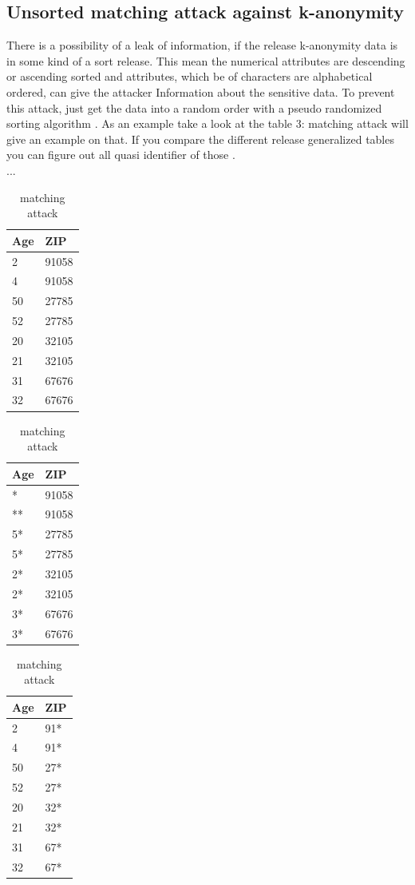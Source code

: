 \documentclass{llncs}
\begin{document}
\subsection{Unsorted matching attack against k-anonymity}
There is a possibility of a leak of information, if the release k-anonymity data is in some kind of a sort release. This mean the numerical attributes are descending or ascending sorted and attributes, which be of characters are alphabetical ordered, can give the attacker Information about the sensitive data. To prevent this attack, just get the data into a random order with a pseudo randomized sorting algorithm \cite{sweeney2002k}. As an example take a look at the table 3: matching attack  will give an example on that. If you compare the different release generalized tables you can figure out all quasi identifier of those \cite{sweeney2002k}.
\\...
\begin{table}	
	\caption{matching attack}
	\centering
	\begin{tabular}[t]{|l|l|}		
	\hline
	Age & ZIP   \\ \hline
	2   & 91058 \\ 
	4   & 91058 \\ 
	50  & 27785 \\ 
	52  & 27785 \\ 
	20  & 32105 \\ 
	21  & 32105 \\ 
	31  & 67676 \\ 
	32  & 67676 \\ \hline
		\end{tabular}
	\hfill
	\begin{tabular}[t]{|l|l|}
	\hline
	Age & ZIP   \\ \hline
	*   & 91058 \\
	**   & 91058 \\
	5*  & 27785 \\
	5*  & 27785 \\
	2*  & 32105 \\
	2*  & 32105 \\
	3*  & 67676 \\
	3*  & 67676 \\ \hline  
	\end{tabular}
	\hfill
	\begin{tabular}[t]{|l|l|}
	\hline
	Age & ZIP   \\	\hline
	2   & 91*   \\
	4   & 91*   \\
	50  & 27*   \\
	52  & 27*   \\
	20  & 32*   \\
	21  & 32*   \\
	31  & 67*   \\
	32  & 67*   \\ \hline  
	\end{tabular}
\end{table}
\end{document}
